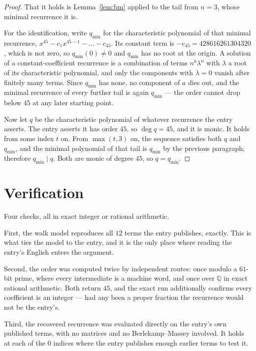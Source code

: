 \documentclass[11pt,a4paper]{article}
\theoremstyle{plain}
\theoremstyle{definition}
\begin{document}
\begin{proof}
That it holds is Lemma~\ref{lem:bm} applied to the tail from $n=3$, whose minimal
recurrence it is.

For the identification, write $q_{\min}$ for the characteristic polynomial of that minimal
recurrence, $x^{45}-c_1x^{45-1}-\dots-c_{45}$. Its constant term is
$-c_{45}=428616261304320$, which is not zero, so $q_{\min}(0)\neq0$ and $q_{\min}$ has no
root at the origin. A solution of a constant-coefficient recurrence is a combination of terms
$n^{k}\lambda^{n}$ with $\lambda$ a root of its characteristic polynomial, and only the
components with $\lambda=0$ vanish after finitely many terms. Since $q_{\min}$ has none, no
component of $a$ dies out, and the minimal recurrence of every further tail is again
$q_{\min}$ --- the order cannot drop below $45$ at any later starting point.

Now let $q$ be the characteristic polynomial of whatever recurrence the entry asserts. The
entry asserts it has order $45$, so $\deg q=45$, and it is monic. It holds from some
index $t$ on. From $\max(t,3)$ on, the sequence satisfies both $q$ and $q_{\min}$, and
the minimal polynomial of that tail is $q_{\min}$ by the previous paragraph; therefore
$q_{\min}\mid q$. Both are monic of degree $45$, so $q=q_{\min}$.
\end{proof}

\section{Verification}

Four checks, all in exact integer or rational arithmetic.

First, the walk model reproduces all $12$ terms the entry publishes, exactly. This is
what ties the model to the entry, and it is the only place where reading the entry's English
enters the argument.

Second, the order was computed twice by independent routes: once modulo a $61$-bit prime, where
every intermediate is a machine word, and once over $\mathbb{Q}$ in exact rational arithmetic.
Both return $45$, and the exact run additionally confirms every coefficient is an integer
--- had any been a proper fraction the recurrence would not be the entry's.

Third, the recovered recurrence was evaluated directly on the entry's own published terms, with
no matrices and no Berlekamp--Massey involved. It holds at each of the $0$ indices where
the entry publishes enough earlier terms to test it.
\end{document}
